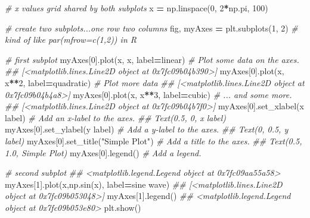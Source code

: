\documentclass[
  12pt,
  krantz2]{krantz}
\makeatletter
\newenvironment{Shaded}{\begin{snugshade}}{\end{snugshade}}
\newcommand{\CommentTok}[1]{\textcolor[rgb]{0.37,0.37,0.37}{\textit{#1}}}
\newcommand{\DecValTok}[1]{\textcolor[rgb]{0.06,0.06,0.06}{#1}}
\newcommand{\NormalTok}[1]{#1}
\newcommand{\OperatorTok}[1]{\textcolor[rgb]{0.43,0.43,0.43}{\textbf{#1}}}
\newcommand{\StringTok}[1]{\textcolor[rgb]{0.5,0.5,0.5}{#1}}
\newenvironment{kframe}{%
\medskip{}
\setlength{\fboxsep}{.8em}
 \def\at@end@of@kframe{}%
 \ifinner\ifhmode%
  \def\at@end@of@kframe{\end{minipage}}%
  \begin{minipage}{\columnwidth}%
 \fi\fi%
 \def\FrameCommand##1{\hskip\@totalleftmargin \hskip-\fboxsep
 \colorbox{shadecolor}{##1}\hskip-\fboxsep
     \hskip-\linewidth \hskip-\@totalleftmargin \hskip\columnwidth}%
 \MakeFramed {\advance\hsize-\width
   \@totalleftmargin\z@ \linewidth\hsize
   \@setminipage}}%
 {\par\unskip\endMakeFramed%
 \at@end@of@kframe}
\renewenvironment{Shaded}{\begin{kframe}}{\end{kframe}}
\makeatother
\begin{document}
\begin{Shaded}
\begin{Highlighting}[]
\CommentTok{\# x values grid shared by both subplots}
\NormalTok{x }\OperatorTok{=}\NormalTok{ np.linspace(}\DecValTok{0}\NormalTok{, }\DecValTok{2}\OperatorTok{*}\NormalTok{np.pi, }\DecValTok{100}\NormalTok{) }

\CommentTok{\# create two subplots...one row two columns}
\NormalTok{fig, myAxes }\OperatorTok{=}\NormalTok{ plt.subplots(}\DecValTok{1}\NormalTok{, }\DecValTok{2}\NormalTok{) }\CommentTok{\# kind of like par(mfrow=c(1,2)) in R}

\CommentTok{\# first subplot}
\NormalTok{myAxes[}\DecValTok{0}\NormalTok{].plot(x, x, label}\OperatorTok{=}\StringTok{\textquotesingle{}linear\textquotesingle{}}\NormalTok{)  }\CommentTok{\# Plot some data on the axes.}
\CommentTok{\#\# [\textless{}matplotlib.lines.Line2D object at 0x7fc09b04b390\textgreater{}]}
\NormalTok{myAxes[}\DecValTok{0}\NormalTok{].plot(x, x}\OperatorTok{**}\DecValTok{2}\NormalTok{, label}\OperatorTok{=}\StringTok{\textquotesingle{}quadratic\textquotesingle{}}\NormalTok{)  }\CommentTok{\# Plot more data }
\CommentTok{\#\# [\textless{}matplotlib.lines.Line2D object at 0x7fc09b04b4a8\textgreater{}]}
\NormalTok{myAxes[}\DecValTok{0}\NormalTok{].plot(x, x}\OperatorTok{**}\DecValTok{3}\NormalTok{, label}\OperatorTok{=}\StringTok{\textquotesingle{}cubic\textquotesingle{}}\NormalTok{)  }\CommentTok{\# ... and some more.}
\CommentTok{\#\# [\textless{}matplotlib.lines.Line2D object at 0x7fc09b04b7f0\textgreater{}]}
\NormalTok{myAxes[}\DecValTok{0}\NormalTok{].set\_xlabel(}\StringTok{\textquotesingle{}x label\textquotesingle{}}\NormalTok{)  }\CommentTok{\# Add an x{-}label to the axes.}
\CommentTok{\#\# Text(0.5, 0, \textquotesingle{}x label\textquotesingle{})}
\NormalTok{myAxes[}\DecValTok{0}\NormalTok{].set\_ylabel(}\StringTok{\textquotesingle{}y label\textquotesingle{}}\NormalTok{)  }\CommentTok{\# Add a y{-}label to the axes.}
\CommentTok{\#\# Text(0, 0.5, \textquotesingle{}y label\textquotesingle{})}
\NormalTok{myAxes[}\DecValTok{0}\NormalTok{].set\_title(}\StringTok{"Simple Plot"}\NormalTok{)  }\CommentTok{\# Add a title to the axes.}
\CommentTok{\#\# Text(0.5, 1.0, \textquotesingle{}Simple Plot\textquotesingle{})}
\NormalTok{myAxes[}\DecValTok{0}\NormalTok{].legend()  }\CommentTok{\# Add a legend.}

\CommentTok{\# second subplot}
\CommentTok{\#\# \textless{}matplotlib.legend.Legend object at 0x7fc09aa55a58\textgreater{}}
\NormalTok{myAxes[}\DecValTok{1}\NormalTok{].plot(x,np.sin(x), label}\OperatorTok{=}\StringTok{\textquotesingle{}sine wave\textquotesingle{}}\NormalTok{)}
\CommentTok{\#\# [\textless{}matplotlib.lines.Line2D object at 0x7fc09b053048\textgreater{}]}
\NormalTok{myAxes[}\DecValTok{1}\NormalTok{].legend()}
\CommentTok{\#\# \textless{}matplotlib.legend.Legend object at 0x7fc09b053e80\textgreater{}}
\NormalTok{plt.show()}
\end{Highlighting}
\end{Shaded}
\end{document}

